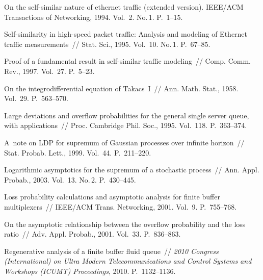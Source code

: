  \begin{multicols}{2}

\renewcommand{\bibname}{\protect\rmfamily Литература}

{\small\frenchspacing
{%
\begin{thebibliography}{99}

On the self-similar nature of ethernet traffic (extended version).
{IEEE/ACM Transactions of Networking}, 1994. Vol.~2. No.\,1. P.~1--15.

Self-similarity in high-speed packet traffic: Analysis and
modeling of Ethernet traffic measurements~// {Stat. Sci.}, 1995.
Vol.~10. No.\,1. P.~67--85.

  Proof of a
fundamental result in self-similar traffic modeling~// {Comp.
Comm. Rev.}, 1997. Vol.~27. P.~5--23.

 On the integrodifferential equation of Takacs~I~//
Ann. Math. Stat., 1958. Vol.~29. P.~563--570.

Large deviations and overflow
probabilities for the general single server queue, with
applications~// {Proc. Cambridge Phil.
Soc.}, 1995. Vol.~118. P.~363--374.

\pagebreak

 A~note on LDP for supremum of Gaussian processes over infinite
horizon~// {Stat. Probab. Lett.}, 1999. Vol.~44. P.~211--220.

Logarithmic asymptotics for the supremum of a stochastic process~//
{Ann. Appl. Probab.}, 2003. Vol.~13. No.\,2. P.~430--445.

Loss probability calculations and asymptotic analysis for finite buffer
multiplexers~// {IEEE/ACM Trans. Networking}, 2001. Vol.~9. P.~755--768.

On the asymptotic relationship between the overflow
probability and the loss ratio~// {Adv. Appl. Probab.},  2001.
Vol.~33. P.~836--863.

  Regenerative
analysis of a finite buffer fluid queue~// \textit{2010
Congress (International) on Ultra Modern Telecommunications and Control Systems and
Workshops (ICUMT) Proceedings}, 2010. P.~1132--1136.


\end{thebibliography}}}
\end{multicols}
